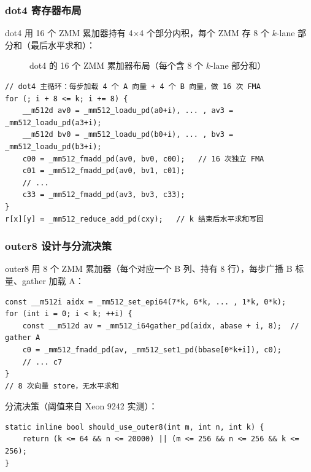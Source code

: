 \documentclass[11pt,a4paper,fontset=fandol]{ctexart}
\begin{document}
\subsubsection{dot4 寄存器布局}
dot4 用 16 个 ZMM 累加器持有 4$\times$4 个部分内积，每个 ZMM 存 8 个 $k$-lane 部分和（最后水平求和）：

\begin{figure}[H]
\centering
{}
\caption{dot4 的 16 个 ZMM 累加器布局（每个含 8 个 $k$-lane 部分和）}
\end{figure}

\begin{lstlisting}
// dot4 主循环：每步加载 4 个 A 向量 + 4 个 B 向量，做 16 次 FMA
for (; i + 8 <= k; i += 8) {
    __m512d av0 = _mm512_loadu_pd(a0+i), ... , av3 = _mm512_loadu_pd(a3+i);
    __m512d bv0 = _mm512_loadu_pd(b0+i), ... , bv3 = _mm512_loadu_pd(b3+i);
    c00 = _mm512_fmadd_pd(av0, bv0, c00);   // 16 次独立 FMA
    c01 = _mm512_fmadd_pd(av0, bv1, c01);
    // ...
    c33 = _mm512_fmadd_pd(av3, bv3, c33);
}
r[x][y] = _mm512_reduce_add_pd(cxy);   // k 结束后水平求和写回
\end{lstlisting}

\subsubsection{outer8 设计与分流决策}
outer8 用 8 个 ZMM 累加器（每个对应一个 B 列、持有 8 行），每步广播 B 标量、gather 加载 A：
\begin{lstlisting}
const __m512i aidx = _mm512_set_epi64(7*k, 6*k, ... , 1*k, 0*k);
for (int i = 0; i < k; ++i) {
    const __m512d av = _mm512_i64gather_pd(aidx, abase + i, 8);  // gather A
    c0 = _mm512_fmadd_pd(av, _mm512_set1_pd(bbase[0*k+i]), c0);
    // ... c7
}
// 8 次向量 store，无水平求和
\end{lstlisting}
分流决策（阈值来自 Xeon 9242 实测）：
\begin{lstlisting}
static inline bool should_use_outer8(int m, int n, int k) {
    return (k <= 64 && n <= 20000) || (m <= 256 && n <= 256 && k <= 256);
}
\end{lstlisting}
\end{document}
